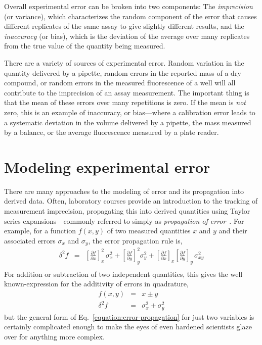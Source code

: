 \documentclass[aps,pre,twocolumn,nofootinbib,superscriptaddress,linenumbers]{revtex4-1}
\begin{document}
Overall experimental error can be broken into two components: The \emph{imprecision} (or variance), which characterizes the random component of the error that causes different replicates of the same assay to give slightly different results, and the \emph{inaccuracy} (or bias), which is the deviation of the average over many replicates from the true value of the quantity being measured.

There are a variety of sources of experimental error. 
Random variation in the quantity delivered by a pipette, random errors in the reported mass of a dry compound, or random errors in the measured fluorescence of a well will all contribute to the imprecision of an assay measurement.
The important thing is that the mean of these errors over many repetitions is zero. 
If the mean is \emph{not} zero, this is an example of inaccuracy, or bias---where a calibration error leads to a systematic deviation in the volume delivered by a pipette, the mass measured by a balance, or the average fluorescence measured by a plate reader.

\section*{Modeling experimental error}

There are many approaches to the modeling of error and its propagation into derived data.
Often, laboratory courses provide an introduction to the tracking of measurement imprecision, propagating this into derived quantities using Taylor series expansions---commonly referred to simply as \emph{propagation of error}~\cite{taylor_introduction_1997}.
For example, for a function $f(x,y)$ of two measured quantities $x$ and $y$ and their associated errors $\sigma_x$ and $\sigma_y$, the error propagation rule is,
\begin{eqnarray}
\delta^2 f &=& \left[\frac{\partial f}{\partial x}\right]^2_x \, \sigma^2_x + \left[\frac{\partial f}{\partial y}\right]^2_y \sigma^2_y + \left[\frac{\partial f}{\partial x}\right]_x \left[\frac{\partial f}{\partial y}\right]_y \, \sigma^2_{xy} \nonumber \\ \label{equation:error-propagation}
\end{eqnarray}
For addition or subtraction of two independent quantities, this gives the well known-expression for the additivity of errors in quadrature,
\begin{eqnarray}
f(x,y) &=& x \pm y \nonumber \\
\delta^2 f &=& \sigma^2_x + \sigma^2_y 
\end{eqnarray}
but the general form of Eq.~\ref{equation:error-propagation} for just two variables is certainly complicated enough to make the eyes of even hardened scientists glaze over for anything more complex.
\end{document}
